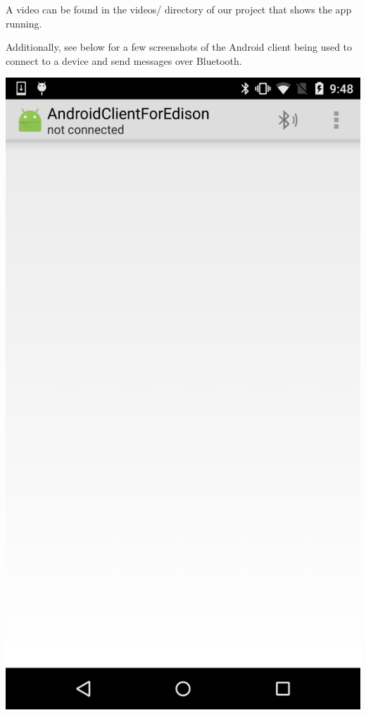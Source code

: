 \documentclass[]{article}
\begin{document}
A video can be found in the videos/ directory of our project that shows the app running.

Additionally, see below for a few screenshots of the Android client being used to connect to a device and send messages over Bluetooth.

\includegraphics[keepaspectratio, width=\textwidth]{photo1}
\end{document}
